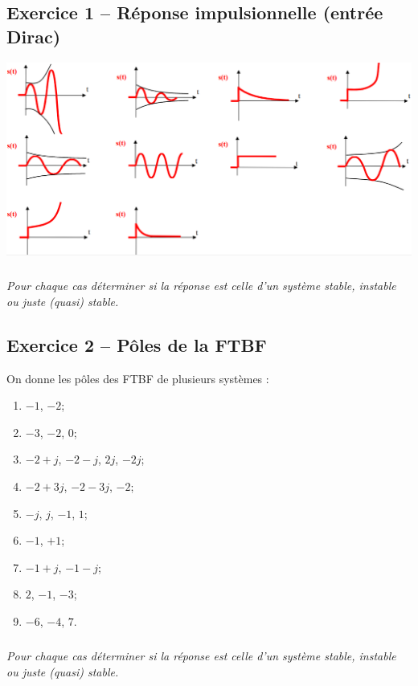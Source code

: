 \documentclass[10pt,fleqn]{article} %
\begin{document}
\def\pathfig{images}

\vspace{4.5cm}
\pagestyle{fancy}
\thispagestyle{plain}

\def\columnseprulecolor{\color{ocre}}
\setlength{\columnseprule}{0.4pt} 

\def\pathfig{images}

\begin{multicols}{2}
\subsection*{Exercice 1 -- Réponse impulsionnelle (entrée Dirac)}
\begin{center}
\includegraphics[width=\linewidth]{images/fig_01}
\end{center}
\subparagraph*{}\textit{Pour chaque cas déterminer si la réponse est celle d'un système stable, instable ou juste (quasi) stable.}

\subsection*{Exercice 2 -- Pôles de la FTBF}
On donne les pôles des FTBF de plusieurs systèmes :
\begin{multicols}{2}
\begin{enumerate}
\item $-1$, $-2$;
\item $-3$, $-2$, $0$;
\item $-2+j$, $-2-j$, $2j$, $-2j$;
\item $-2+3j$, $-2-3j$, $-2$;
\item $-j$, $j$, $-1$, $1$;
\item $-1$, $+1$;
\item $-1+j$, $-1-j$;
\item $2$, $-1$, $-3$;
\item $-6$, $-4$, $7$.
\end{enumerate}
\end{multicols}
\subparagraph*{}\textit{Pour chaque cas déterminer si la réponse est celle d'un système stable, instable ou juste  (quasi) stable.}






\end{multicols}
\end{document}
